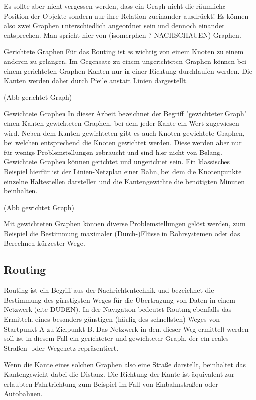 \documentclass[10pt,a4paper]{report}
\begin{document}
Es sollte aber nicht vergessen werden, dass ein Graph nicht die räumliche Position der Objekte sondern nur ihre Relation zueinander ausdrückt! Es können also zwei Graphen unterschiedlich angeordnet sein und dennoch einander entsprechen. Man spricht hier von (isomorphen ? NACHSCHAUEN) Graphen.

Gerichtete Graphen
Für das Routing ist es wichtig von einem Knoten zu einem anderen zu gelangen. Im Gegensatz zu einem ungerichteten Graphen können bei einem gerichteten Graphen Kanten nur in einer Richtung durchlaufen werden. Die Kanten werden daher durch Pfeile anstatt Linien dargestellt. 

(Abb gerichtet Graph)

Gewichtete Graphen
In dieser Arbeit bezeichnet der Begriff "gewichteter Graph" einen Kanten-gewichteten Graphen, bei dem jeder Kante ein Wert zugewiesen wird. Neben dem Kanten-gewichteten gibt es auch Knoten-gewichtete Graphen, bei welchen entsprechend die Knoten gewichtet werden. Diese werden aber nur für wenige Problemstellungen gebraucht und sind hier nicht von Belang. Gewichtete Graphen können gerichtet und ungerichtet sein. Ein klassisches Beispiel hierfür ist der Linien-Netzplan einer Bahn, bei dem die Knotenpunkte einzelne Haltestellen darstellen und die Kantengewichte die benötigten Minuten beinhalten.

(Abb gewichtet Graph)

Mit gewichteten Graphen können diverse Problemstellungen gelöst werden, zum Beispiel die Bestimmung maximaler (Durch-)Flüsse in Rohrsystemen oder das Berechnen kürzester Wege.

\subsection{Routing}

Routing ist ein Begriff aus der Nachrichtentechnik und bezeichnet die Bestimmung des günstigsten Weges für die Übertragung von Daten in einem Netzwerk (cite DUDEN). In der Navigation bedeutet Routing ebenfalls das Ermitteln eines besonders günstigen (häufig des schnellsten) Weges von Startpunkt A zu Zielpunkt B. Das Netzwerk in dem dieser Weg ermittelt werden soll ist in diesem Fall ein gerichteter und gewichteter Graph, der ein reales Straßen- oder Wegenetz repräsentiert.

Wenn die Kante eines solchen Graphen also eine Straße darstellt, beinhaltet das Kantengewicht dabei die Distanz. Die Richtung der Kante ist äquivalent zur erlaubten Fahrtrichtung zum Beispiel im Fall von Einbahnstraßen oder Autobahnen.
\end{document}
